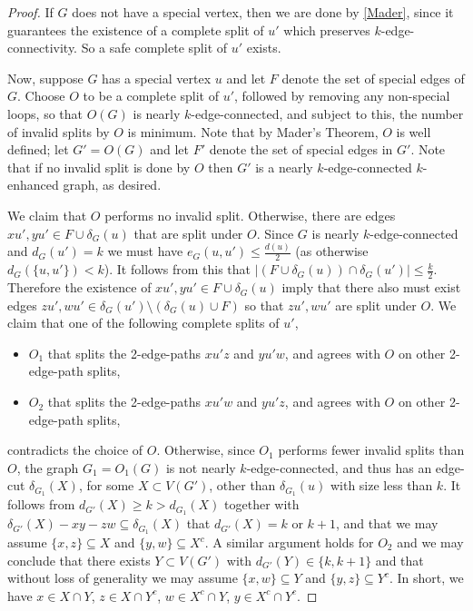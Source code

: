 \documentclass[letterpaper,11pt]{article}
\theoremstyle{definition}
\begin{document}
\begin{proof}
	If $G$ does not have a special vertex, then we are done by \cref{Mader}, since it guarantees the existence of a complete split of $u'$ which preserves $k$-edge-connectivity. So a safe complete split of $u'$ exists. 
	
	Now, suppose $G$ has a special vertex $u$ and let $F$ denote the set of special edges of $G$.  Choose $O$ to be a complete split of $u'$, followed by removing any non-special loops, so that $O(G)$ is nearly $k$-edge-connected, and subject to this, the number of invalid splits by $O$ is minimum. Note that by Mader's Theorem, $O$ is well defined; let $G'= O(G)$ and let $F'$ denote the set of special edges in $G'$. Note that if no invalid split is done by $O$ then $G'$ is a nearly $k$-edge-connected $k$-enhanced graph, as desired.
	
	We claim that $O$ performs no invalid split. Otherwise, there are edges $xu', yu'\in F \cup \delta_G(u)$ that are split under $O$. 	 Since $G$ is nearly $k$-edge-connected and $d_G(u') = k$ we must have $e_G(u,u') \le \frac{d(u)}{2}$ (as otherwise $d_G( \{u,u'\}) < k$).  It follows from this that $| (F \cup \delta_G(u) ) \cap \delta_G(u')| \le \frac{k}{2}$.  Therefore the existence of $xu',yu' \in F \cup \delta_G(u)$ imply that there also must exist edges $zu', wu' \in \delta_G(u') \setminus (\delta_G(u)\cup F)$ so that $zu',  wu'$ are split under  $O$.  We claim that one of the following complete splits of $u'$,
	
	\begin{itemize}
		\item $O_1$ that splits the 2-edge-paths $xu'z$ and $yu'w$, and agrees with $O$ on other 2-edge-path splits,
		\item 
		$O_2$ that splits the 2-edge-paths $xu'w$ and $yu'z$, and agrees with $O$ on other 2-edge-path splits,
	\end{itemize} 
	contradicts the choice of $O$. Otherwise, since $O_1$ performs fewer invalid splits than $O$, the graph $G_1 = O_1(G)$ is not nearly $k$-edge-connected, and thus has an edge-cut $\delta_{G_1}(X)$, for some $X\subset V(G')$, other than $\delta_{G_1}(u)$ with size less than $k$. It follows from $d_{G'}(X)\ge k >d_{G_1}(X) $ together with $\delta_{G'}(X)- xy-zw \subseteq \delta_{G_1}(X)$ that $d_{G'}(X)= k$ or $k+1$, and that we may assume $\{x, z\}\subseteq X$ and $\{y, w\}\subseteq X^c$. A similar argument holds for $O_2$ and we may conclude that there exists $Y\subset V(G')$ with $d_{G'} (Y) \in \{k, k+1\}$ and that without loss of generality we may assume $\{x, w\}\subseteq Y$ and $\{y, z\} \subseteq Y^c$. In short, we have $x\in X\cap Y$, $z \in X\cap Y^c$, $w\in X^c \cap Y$, $y\in X^c \cap Y^c$.
	

\end{proof}
\end{document}
